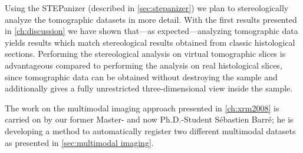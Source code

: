 Using the STEPanizer (described in \autoref{sec:stepanizer}) we plan to stereologically analyze the tomographic datasets in more detail. With the first results presented in \autoref{ch:discussion} we have shown that---as expected---analyzing tomographic data yields results which match stereological results obtained from classic histological sections. Performing the stereological analysis on virtual tomographic slices is advantageous compared to performing the analysis on real histological slices, since tomographic data can be obtained without destroying the sample and additionally gives a fully unrestricted three-dimensional view inside the sample.

The work on the multimodal imaging approach presented in \autoref{ch:xrm2008} is carried on by our former Master- and now Ph.D.-Student Sébastien Barré; he is developing a method to automatically register two different multimodal datasets as presented in \autoref{sec:multimodal imaging}.